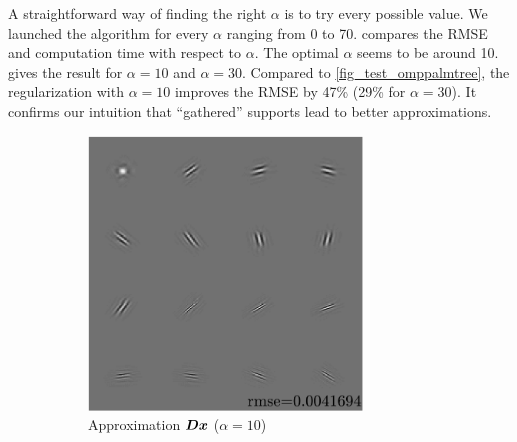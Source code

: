 A straightforward way of finding the right $\alpha$ is to try every possible value. We launched the algorithm for every $\alpha$ ranging from 0 to 70.  compares the RMSE and computation time with respect to $\alpha$. The optimal $\alpha$ seems to be around 10.
 gives the result for $\alpha=10$ and $\alpha=30$. Compared to \cref{fig_test_omppalmtree}, the regularization with $\alpha=10$ improves the RMSE by 47\% (29\% for $\alpha=30$). It confirms our intuition that “gathered” supports lead to better approximations.



\begin{figure}[!h] \centering
\begin{subfigure}[b]{0.49\textwidth}\centering
\includegraphics[width=0.8\textwidth]{figures/tree-unbalanced-supp/xp_learnsupp256_curvelet_decomp3[tree-binary_dpth4]_supp-diracs_[usegrad1_every5_add5_totinit0_totadd279_alpha10]_approx.pdf}
\caption{Approximation $\bm{D}\bm{x}$ ($\alpha=10$)}
\end{subfigure}
\begin{subfigure}[b]{0.49\textwidth}\centering

\end{subfigure}
\end{figure}
